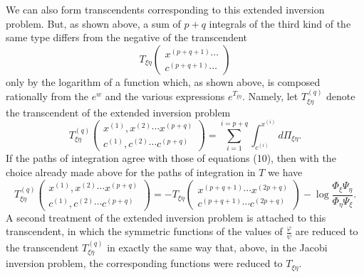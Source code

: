 \documentclass[10pt]{article}
\begin{document}
We can also form transcendents corresponding to this extended inversion problem. But, as shown above, a sum of \(p+q\) integrals of the third kind of the same type differs from the negative of the transcendent
\[
T_{\xi\eta}\begin{pmatrix}x^{(p+q+1)}\cdots\\c^{(p+q+1)}\cdots\end{pmatrix}
\]
only by the logarithm of a function which, as shown above, is composed rationally from the \(e^w\) and the various expressions \(e^{T_{\xi\eta}}\). Namely, let \(T^{(q)}_{\xi\eta}\) denote the transcendent of the extended inversion problem
\[
T^{(q)}_{\xi\eta}\begin{pmatrix}x^{(1)},x^{(2)}\cdots x^{(p+q)}\\c^{(1)},c^{(2)}\cdots c^{(p+q)}\end{pmatrix}
=\sum_{i=1}^{i=p+q}\int_{c^{(i)}}^{x^{(i)}}d\Pi_{\xi\eta}.
\]
If the paths of integration agree with those of equations (10), then with the choice already made above for the paths of integration in \(T\) we have
\begingroup\footnotesize
\[
T^{(q)}_{\xi\eta}\begin{pmatrix}x^{(1)},x^{(2)}\cdots x^{(p+q)}\\c^{(1)},c^{(2)}\cdots c^{(p+q)}\end{pmatrix}
=-T_{\xi\eta}\begin{pmatrix}x^{(p+q+1)}\cdots x^{(2p+q)}\\c^{(p+q+1)}\cdots c^{(2p+q)}\end{pmatrix}
-\log\frac{\Phi_\xi\Psi_\eta}{\Phi_\eta\Psi_\xi}.
\]
\endgroup
A second treatment of the extended inversion problem is attached to this transcendent, in which the symmetric functions of the values of \(\frac{\varphi}{\psi}\) are reduced to the transcendent \(T_{\xi\eta}^{(q)}\) in exactly the same way that, above, in the Jacobi inversion problem, the corresponding functions were reduced to \(T_{\xi\eta}\).
\end{document}
